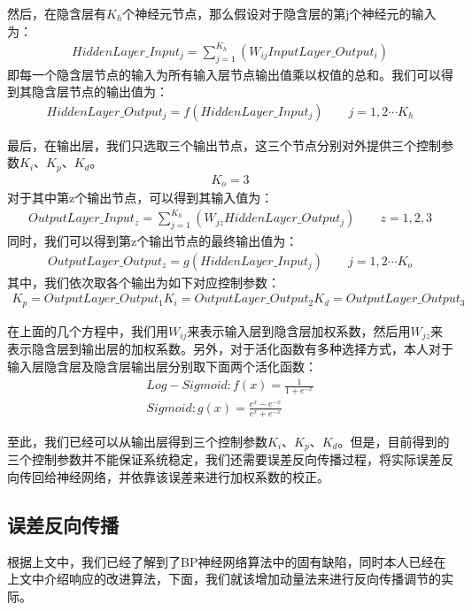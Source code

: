 然后，在隐含层有$K_{h}$个神经元节点，那么假设对于隐含层的第j个神经元的输入为：
\begin{align}
	HiddenLayer\_Input_{j} = \sum_{j=1}^{K_{h}}(W_{ij}InputLayer\_Output_{i})
\end{align}
即每一个隐含层节点的输入为所有输入层节点输出值乘以权值的总和。我们可以得到其隐含层节点的输出值为：
\begin{align}
	HiddenLayer\_Output_{j} = f(HiddenLayer\_Input_{j}) \qquad j = 1, 2 \cdots K_{h}
\end{align}

最后，在输出层，我们只选取三个输出节点，这三个节点分别对外提供三个控制参数$K_{i}$、$K_{p}$、$K_{d}$。
\begin{align}
K_{o} = 3
\end{align}
对于其中第z个输出节点，可以得到其输入值为：
\begin{align}
OutputLayer\_Input_{z} = \sum_{j=1}^{K_{h}}(W_{jz}HiddenLayer\_Output_{j}) \qquad z = 1, 2, 3
\end{align}
同时，我们可以得到第z个输出节点的最终输出值为：
\begin{align}
OutputLayer\_Output_{z} = g(HiddenLayer\_Input_{j}) \qquad j = 1, 2 \cdots K_{o}
\end{align}
其中，我们依次取各个输出为如下对应控制参数：
\begin{align}
K_{p} = OutputLayer\_Output_{1}
K_{i} = OutputLayer\_Output_{2}
K_{d} = OutputLayer\_Output_{3}
\end{align}

在上面的几个方程中，我们用$W_{ij}$来表示输入层到隐含层加权系数，然后用$W_{jz}$来表示隐含层到输出层的加权系数。另外，对于活化函数有多种选择方式，本人对于输入层\-隐含层及隐含层\-输出层分别取下面两个活化函数：
\begin{align}
Log-Sigmoid : f(x) = \frac{1}{1 + e^{-x}} \\
Sigmoid : g(x) = \frac{e^{x} - e^{-x}}{e^{x} + e^{-x}}
\end{align}

至此，我们已经可以从输出层得到三个控制参数$K_{i}$、$K_{p}$、$K_{d}$。但是，目前得到的三个控制参数并不能保证系统稳定，我们还需要误差反向传播过程，将实际误差反向传回给神经网络，并依靠该误差来进行加权系数的校正。

\subsection{误差反向传播}
根据上文中，我们已经了解到了BP神经网络算法中的固有缺陷，同时本人已经在上文中介绍响应的改进算法，下面，我们就该增加动量法来进行反向传播调节的实际。

